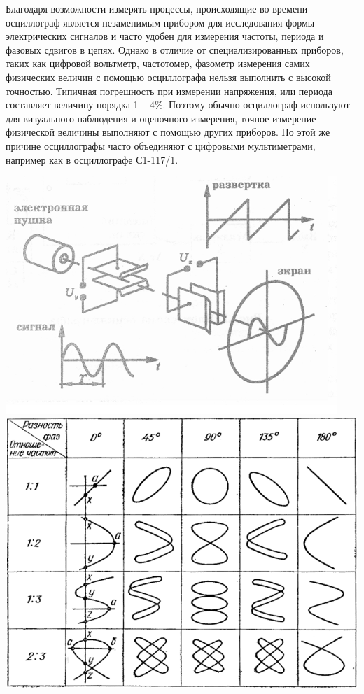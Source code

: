 \documentclass[12pt]{article}
\begin{document}
Благодаря возможности измерять процессы, происходящие во времени осциллограф является незаменимым прибором для исследования формы электрических сигналов и часто удобен для измерения частоты, периода и фазовых сдвигов в цепях. Однако в отличие от специализированных приборов, таких как цифровой вольтметр, частотомер, фазометр измерения самих физических величин с помощью осциллографа нельзя выполнить с высокой точностью. Типичная погрешность при измерении напряжения, или периода составляет величину порядка 1 – 4\%. Поэтому обычно осциллограф используют для визуального наблюдения и оценочного измерения, точное измерение физической величины выполняют с помощью других приборов. По этой же причине осциллографы часто объединяют с цифровыми мультиметрами, например как в осциллографе С1-117/1.
\begin{center}
\includegraphics{img1}
\includegraphics{img5}
\end{center}
\end{document}
